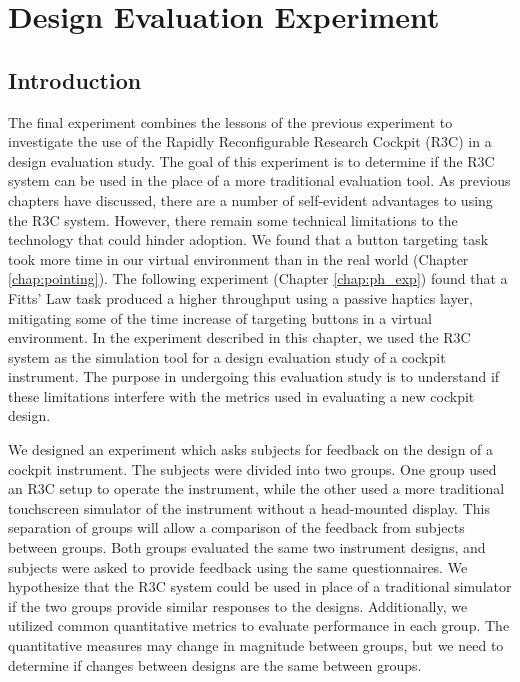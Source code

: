 \chapter{Design Evaluation Experiment}
\label{chap:de_exp}

\section{Introduction}

The final experiment combines the lessons of the previous experiment to investigate the use of the Rapidly Reconfigurable Research Cockpit (R3C) in a design evaluation study.
The goal of this experiment is to determine if the R3C system can be used in the place of a more traditional evaluation tool.
As previous chapters have discussed, there are a number of self-evident advantages to using the R3C system.
However, there remain some technical limitations to the technology that could hinder adoption.
We found that a button targeting task took more time in our virtual environment than in the real world (Chapter \ref{chap:pointing}).
The following experiment (Chapter \ref{chap:ph_exp}) found that a Fitts' Law task produced a higher throughput using a passive haptics layer, mitigating some of the time increase of targeting buttons in a virtual environment.
In the experiment described in this chapter, we used the R3C system as the simulation tool for a design evaluation study of a cockpit instrument.
The purpose in undergoing this evaluation study is to understand if these limitations interfere with the metrics used in evaluating a new cockpit design.

We designed an experiment which asks subjects for feedback on the design of a cockpit instrument.
The subjects were divided into two groups.
One group used an R3C setup to operate the instrument, while the other used a more traditional touchscreen simulator of the instrument without a head-mounted display.
This separation of groups will allow a comparison of the feedback from subjects between groups.
Both groups evaluated the same two instrument designs, and subjects were asked to provide feedback using the same questionnaires.
We hypothesize that the R3C system could be used in place of a traditional simulator if the two groups provide similar responses to the designs.
Additionally, we utilized common quantitative metrics to evaluate performance in each group.
The quantitative measures may change in magnitude between groups, but we need to determine if changes between designs are the same between groups.

